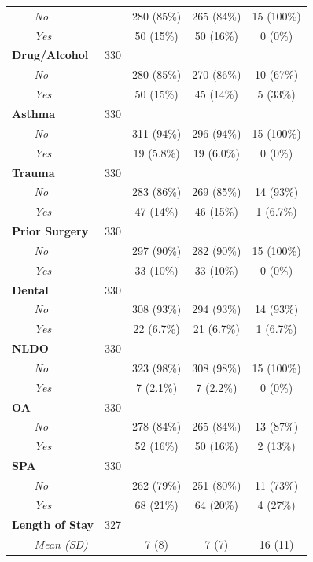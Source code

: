 \documentclass[
]{article}
\begin{document}
\begin{table}[t]
\begin{tabular*}{0.7\linewidth}{@{\extracolsep{\fill}}lcccc}
{\itshape     No} &  & 280 (85\%) & 265 (84\%) & 15 (100\%) \\ 
{\itshape     Yes} &  & 50 (15\%) & 50 (16\%) & 0 (0\%) \\ 
{\bfseries Drug/Alcohol} & 330 &  &  &  \\ 
{\itshape     No} &  & 280 (85\%) & 270 (86\%) & 10 (67\%) \\ 
{\itshape     Yes} &  & 50 (15\%) & 45 (14\%) & 5 (33\%) \\ 
{\bfseries Asthma} & 330 &  &  &  \\ 
{\itshape     No} &  & 311 (94\%) & 296 (94\%) & 15 (100\%) \\ 
{\itshape     Yes} &  & 19 (5.8\%) & 19 (6.0\%) & 0 (0\%) \\ 
{\bfseries Trauma} & 330 &  &  &  \\ 
{\itshape     No} &  & 283 (86\%) & 269 (85\%) & 14 (93\%) \\ 
{\itshape     Yes} &  & 47 (14\%) & 46 (15\%) & 1 (6.7\%) \\ 
{\bfseries Prior Surgery} & 330 &  &  &  \\ 
{\itshape     No} &  & 297 (90\%) & 282 (90\%) & 15 (100\%) \\ 
{\itshape     Yes} &  & 33 (10\%) & 33 (10\%) & 0 (0\%) \\ 
{\bfseries Dental} & 330 &  &  &  \\ 
{\itshape     No} &  & 308 (93\%) & 294 (93\%) & 14 (93\%) \\ 
{\itshape     Yes} &  & 22 (6.7\%) & 21 (6.7\%) & 1 (6.7\%) \\ 
{\bfseries NLDO} & 330 &  &  &  \\ 
{\itshape     No} &  & 323 (98\%) & 308 (98\%) & 15 (100\%) \\ 
{\itshape     Yes} &  & 7 (2.1\%) & 7 (2.2\%) & 0 (0\%) \\ 
{\bfseries OA} & 330 &  &  &  \\ 
{\itshape     No} &  & 278 (84\%) & 265 (84\%) & 13 (87\%) \\ 
{\itshape     Yes} &  & 52 (16\%) & 50 (16\%) & 2 (13\%) \\ 
{\bfseries SPA} & 330 &  &  &  \\ 
{\itshape     No} &  & 262 (79\%) & 251 (80\%) & 11 (73\%) \\ 
{\itshape     Yes} &  & 68 (21\%) & 64 (20\%) & 4 (27\%) \\ 
{\bfseries Length of Stay} & 327 &  &  &  \\ 
{\itshape     Mean (SD)} &  & 7 (8) & 7 (7) & 16 (11) \\ 

\end{tabular*}
\end{table}
\end{document}
